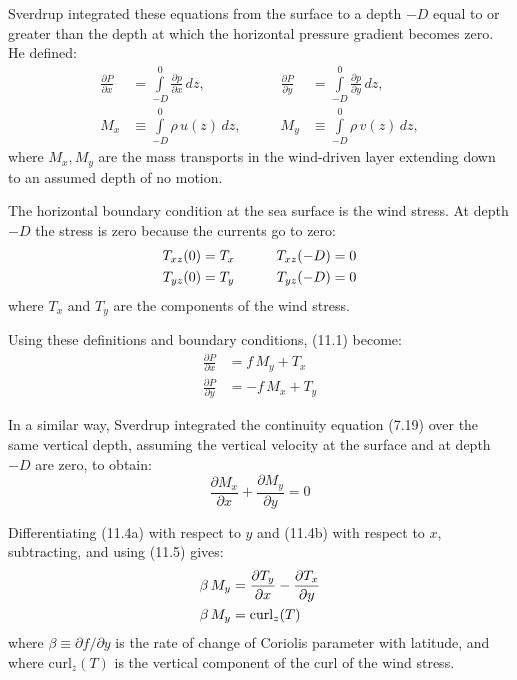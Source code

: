 Sverdrup integrated these equations from the surface to a depth $-D$ equal
to or greater than the depth at which the horizontal pressure gradient becomes
zero. He defined:
\begin{subequations}
\begin{alignat}{2}
\frac{\partial{P}}{\partial{x}} &= \int\limits_{-D}^{0} \frac{\partial{p}}{\partial{x}}\,dz,  &\qquad
\frac{\partial{P}}{\partial{y}} &= \int\limits_{-D}^{0} \frac{\partial{p}}{\partial{y}}\,dz,  \\
M_x &\equiv \int\limits_{-D}^{0} \rho\,u(z)\,dz,          &\qquad M_y &\equiv \int\limits_{-D}^{0} \rho\,v(z)\,dz,
\end{alignat}
\end{subequations}
where $M_x, M_y$ are the mass transports in the wind-driven layer
extending down to an assumed depth of no motion.

The horizontal boundary condition at the sea surface is the wind stress. At depth $-D$ the stress is zero because the currents go to zero:
\begin{alignat}{2}
T_{xz}(0) &= T_x & \qquad T_{xz}(-D) &= 0
\notag \\
T_{yz}(0) &= T_y & \qquad T_{yz}(-D) &= 0
\end{alignat}
where $T_x$ and $T_y$ are the components of the wind stress.

Using these definitions and boundary conditions, (11.1) become:
\begin{subequations}
\begin{align}
\frac{\partial{P}}{\partial{x}} &= f\,M_y + T_x  \\
\frac{\partial{P}}{\partial{y}} &= -f\,M_x + T_y
\end{align}
\end{subequations}

In a similar way, Sverdrup integrated the continuity equation (7.19) over the
same vertical depth, assuming the vertical velocity at the surface and at depth
$-D$ are zero, to obtain:
\begin{equation}
\frac{\partial{M_x}}{\partial{x}} + \frac{\partial{M_y}}{\partial{y}} = 0
\end{equation}

Differentiating (11.4a) with respect to $y$ and (11.4b) with respect to $x$,
subtracting, and using (11.5) gives:
\begin{align}
\beta\,M_y &= \frac{\partial{T_y}}{\partial{x}} - \frac{\partial{T_x}}{\partial{y}}
\notag \\
\beta\,M_y &= \text{curl}_z(T)
\end{align}
where $\beta \equiv \partial{f}/\partial{y}$ is the rate of change of Coriolis
parameter with latitude, and where curl$_z(T)$ is the vertical component
of the curl of the wind stress.

